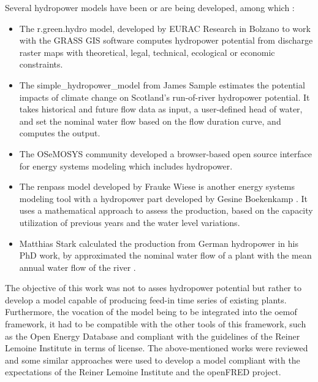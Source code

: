 Several hydropower models have been or are being developed, among which : 
\begin{itemize}
 \item The r.green.hydro model, developed by EURAC Research in Bolzano \cite{grass} to work with the GRASS GIS software computes hydropower potential from discharge raster maps with theoretical, legal, technical, ecological or economic constraints.
 \item The simple{\_}hydropower{\_}model from James Sample \cite{sample} estimates the potential impacts of climate change on Scotland's run-of-river hydropower potential. It takes historical and future flow data as input, a user-defined head of water, and set the nominal water flow based on the flow duration curve, and computes the output.
 \item The OSeMOSYS community \cite{osemosys} developed a browser-based open source interface for energy systems modeling which includes hydropower.
 \item The renpass model \cite{wiese} developed by Frauke Wiese is another energy systems modeling tool with a hydropower part developed by Gesine Boekenkamp \cite{gesine}. It uses a mathematical approach to assess the production, based on the capacity utilization of previous years and the water level variations.
 \item Matthias Stark calculated the production from German hydropower in his PhD work, by approximated the nominal water flow of a plant with the mean annual water flow of the river \cite{stark}.
\end{itemize}
The objective of this work was not to asses hydropower potential but rather to develop a model capable of producing feed-in time series of existing plants. Furthermore, the vocation of the model being to be integrated into the oemof framework, it had to be compatible with the other tools of this framework, such as the Open Energy Database and compliant with the guidelines of the Reiner Lemoine Institute in terms of license. The above-mentioned works were reviewed and some similar approaches were used to develop a model compliant with the expectations of the Reiner Lemoine Institute and the openFRED project.
